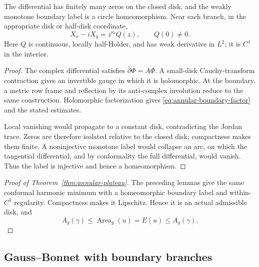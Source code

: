 \begin{lemma}
\label{lem:annular-disk-strict-trace}
The differential has finitely many zeros on the closed disk,
and the weakly monotone boundary label is a circle homeomorphism.
Near each branch, in the appropriate disk or half-disk coordinate,
\begin{equation}
 X_x-iX_y=z^m Q(z),\qquad Q(0)\ne0 .
 \label{eq:annular-boundary-factor}
\end{equation}
Here $Q$ is continuous, locally half-Holder, and has weak derivative
in $L^2$; it is $C^1$ in the interior.
\end{lemma}
\begin{proof}
The complex differential satisfies $\bar\partial\Phi=A\Phi$.
A small-disk Cauchy-transform contraction gives an invertible
gauge in which it is holomorphic. At the boundary, a metric row
frame and reflection by its anti-complex involution reduce to the
same construction. Holomorphic factorization gives
\eqref{eq:annular-boundary-factor} and the stated estimates.

Local vanishing would propagate to a constant disk, contradicting
the Jordan trace. Zeros are therefore isolated relative to the
closed disk; compactness makes them finite. A noninjective monotone
label would collapse an arc, on which the tangential differential,
and by conformality the full differential, would vanish.
Thus the label is injective and hence a homeomorphism.
\end{proof}

\begin{proof}[Proof of Theorem~\ref{thm:annular-plateau}]
The preceding lemmas give the same conformal harmonic minimum
with a homeomorphic boundary label and within-$C^1$ regularity.
Compactness makes it Lipschitz. Hence it is an actual admissible
disk, and
\[
 A_g(\gamma)\leq\operatorname{Area}_g(u)=E(u)\leq A_g(\gamma).
\]
\end{proof}

\subsection{Gauss--Bonnet with boundary branches}
\label{sec:annular-disk-gauss-bonnet}

